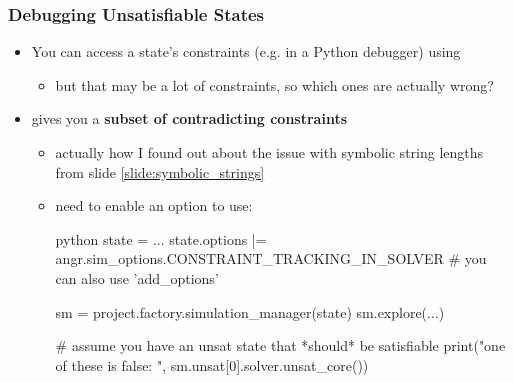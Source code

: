\documentclass[aspectratio=169]{beamer}
\begin{document}
\begin{frame}[fragile]
    \frametitle{Debugging Unsatisfiable States}

    \begin{itemize}
        \item You can access a state's constraints (e.g. in a Python debugger) using 
\pause
        \begin{itemize}
            \item but that may be a lot of constraints, so which ones are actually wrong?
        \end{itemize}
\pause
        \item {} gives you a \textbf{\color{brightpurple}subset of contradicting constraints}
        \begin{itemize}
            \item actually how I found out about the issue with symbolic string lengths from slide \ref{slide:symbolic_strings}
\pause
            \item need to enable an option to use:\begin{codebox}{python}
state = ...
state.options |= {angr.sim_options.CONSTRAINT_TRACKING_IN_SOLVER}
# you can also use 'add_options'

sm = project.factory.simulation_manager(state)
sm.explore(...)

# assume you have an unsat state that *should* be satisfiable
print("one of these is false: ", sm.unsat[0].solver.unsat_core())
\end{codebox}%
        \end{itemize}
    \end{itemize}
\end{frame}

	
\end{document}
